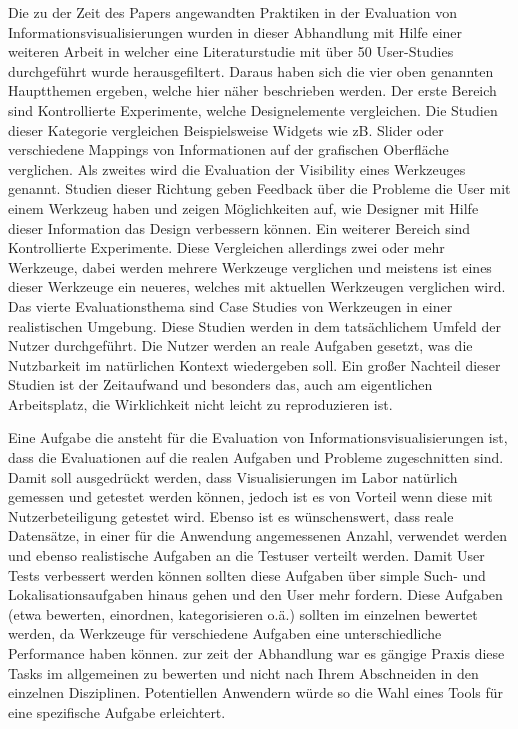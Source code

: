 \documentclass[draft=false
              ,paper=a4
              ,twoside=false
              ,fontsize=11pt
              ,headsepline
              ,BCOR10mm
              ,DIV11
              ]{scrbook}
\begin{document}
Die zu der Zeit des Papers angewandten Praktiken in der Evaluation von Informationsvisualisierungen wurden in dieser Abhandlung mit Hilfe einer weiteren Arbeit \cite{komlodi2004information} in welcher eine Literaturstudie mit über 50 User-Studies durchgeführt wurde herausgefiltert. Daraus haben sich die vier oben genannten Hauptthemen ergeben, welche hier näher beschrieben werden. Der erste Bereich sind Kontrollierte Experimente, welche Designelemente vergleichen. Die Studien dieser Kategorie vergleichen Beispielsweise Widgets wie zB. Slider oder verschiedene Mappings von Informationen auf der grafischen Oberfläche verglichen.
Als zweites wird die Evaluation der Visibility eines Werkzeuges genannt. Studien dieser Richtung geben Feedback über die Probleme die User mit einem Werkzeug haben und zeigen Möglichkeiten auf, wie Designer mit Hilfe dieser Information das Design verbessern können. Ein weiterer Bereich sind Kontrollierte Experimente. Diese Vergleichen allerdings zwei oder mehr Werkzeuge, dabei werden mehrere Werkzeuge verglichen und meistens ist eines dieser Werkzeuge ein neueres, welches mit aktuellen Werkzeugen verglichen wird. Das vierte Evaluationsthema sind Case Studies von Werkzeugen in einer realistischen Umgebung. Diese Studien werden in dem tatsächlichem Umfeld der Nutzer durchgeführt. Die Nutzer werden an reale Aufgaben gesetzt, was die Nutzbarkeit im natürlichen Kontext wiedergeben soll. Ein großer Nachteil dieser Studien ist der Zeitaufwand und besonders das, auch am eigentlichen Arbeitsplatz, die Wirklichkeit nicht leicht zu reproduzieren ist.

Eine Aufgabe die ansteht für die Evaluation von Informationsvisualisierungen ist, dass die Evaluationen auf die realen Aufgaben und Probleme zugeschnitten sind. Damit soll ausgedrückt werden, dass Visualisierungen im Labor natürlich gemessen und getestet werden können, jedoch ist es von Vorteil wenn diese mit Nutzerbeteiligung getestet wird. Ebenso ist es wünschenswert, dass reale Datensätze, in einer für die Anwendung angemessenen Anzahl, verwendet werden und ebenso realistische Aufgaben an die Testuser verteilt werden. Damit User Tests verbessert werden können sollten diese Aufgaben über simple Such- und Lokalisationsaufgaben hinaus gehen und den User mehr fordern. Diese Aufgaben (etwa bewerten, einordnen, kategorisieren o.ä.) sollten im einzelnen bewertet werden, da Werkzeuge für verschiedene Aufgaben eine unterschiedliche Performance haben können. zur zeit der Abhandlung war es gängige Praxis diese Tasks im allgemeinen zu bewerten und nicht nach Ihrem Abschneiden in den einzelnen Disziplinen. Potentiellen Anwendern würde so die Wahl eines Tools für eine spezifische Aufgabe erleichtert.
\end{document}
